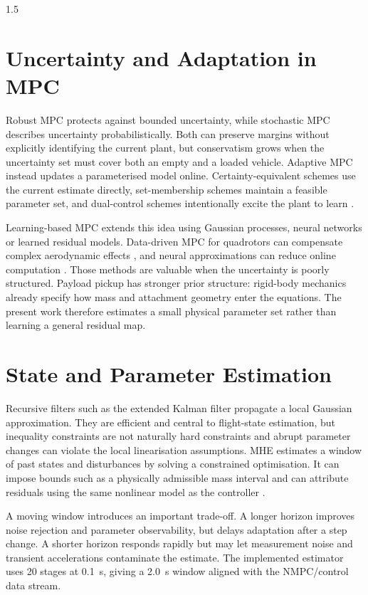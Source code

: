 \begin{spacing}{1.5}
\section{Uncertainty and Adaptation in MPC}

Robust MPC protects against bounded uncertainty, while stochastic MPC describes uncertainty probabilistically. Both can preserve margins without explicitly identifying the current plant, but conservatism grows when the uncertainty set must cover both an empty and a loaded vehicle. Adaptive MPC instead updates a parameterised model online. Certainty-equivalent schemes use the current estimate directly, set-membership schemes maintain a feasible parameter set, and dual-control schemes intentionally excite the plant to learn \cite{aswani2013learning,hewing2020learning}.

Learning-based MPC extends this idea using Gaussian processes, neural networks or learned residual models. Data-driven MPC for quadrotors can compensate complex aerodynamic effects \cite{torrente2021datadriven}, and neural approximations can reduce online computation \cite{salzmann2023neural}. Those methods are valuable when the uncertainty is poorly structured. Payload pickup has stronger prior structure: rigid-body mechanics already specify how mass and attachment geometry enter the equations. The present work therefore estimates a small physical parameter set rather than learning a general residual map.

\section{State and Parameter Estimation}

Recursive filters such as the extended Kalman filter propagate a local Gaussian approximation. They are efficient and central to flight-state estimation, but inequality constraints are not naturally hard constraints and abrupt parameter changes can violate the local linearisation assumptions. MHE estimates a window of past states and disturbances by solving a constrained optimisation. It can impose bounds such as a physically admissible mass interval and can attribute residuals using the same nonlinear model as the controller \cite{rawlings2017mpc,rao2003mhe}.

A moving window introduces an important trade-off. A longer horizon improves noise rejection and parameter observability, but delays adaptation after a step change. A shorter horizon responds rapidly but may let measurement noise and transient accelerations contaminate the estimate. The implemented estimator uses 20 stages at \SI{0.1}{s}, giving a \SI{2.0}{s} window aligned with the NMPC/control data stream.


\end{spacing}
